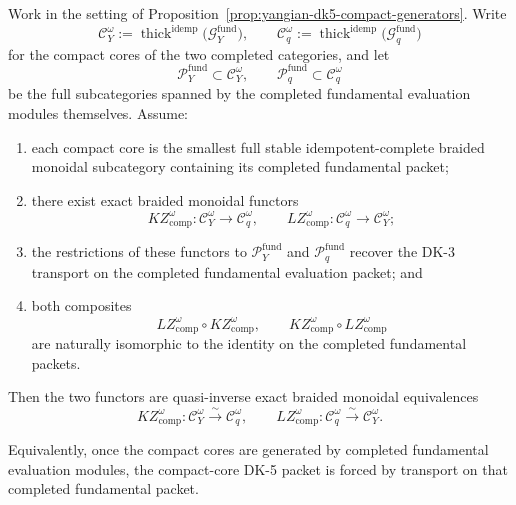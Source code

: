 \begin{proposition}
\label{prop:yangian-dk5-fundamental-packet}
Work in the setting of
Proposition~\ref{prop:yangian-dk5-compact-generators}.  Write
\[
\mathcal{C}_Y^\omega
:=
\operatorname{thick}^{\mathrm{idemp}}
\bigl(\mathcal{G}^{\mathrm{fund}}_{Y}\bigr),
\qquad
\mathcal{C}_q^\omega
:=
\operatorname{thick}^{\mathrm{idemp}}
\bigl(\mathcal{G}^{\mathrm{fund}}_{q}\bigr)
\]
for the compact cores of the two completed categories, and let
\[
\mathcal{P}^{\mathrm{fund}}_{Y}\subset \mathcal{C}_Y^\omega,
\qquad
\mathcal{P}^{\mathrm{fund}}_{q}\subset \mathcal{C}_q^\omega
\]
be the full subcategories spanned by the completed fundamental
evaluation modules themselves.  Assume:
\begin{enumerate}[label=\textup{(\roman*)}]
\item each compact core is the smallest full stable
  idempotent-complete braided monoidal subcategory containing its
  completed fundamental packet;
\item there exist exact braided monoidal functors
  \[
  KZ^\omega_{\mathrm{comp}}\colon
  \mathcal{C}_Y^\omega \to \mathcal{C}_q^\omega,
  \qquad
  LZ^\omega_{\mathrm{comp}}\colon
  \mathcal{C}_q^\omega \to \mathcal{C}_Y^\omega;
  \]
\item the restrictions of these functors to
  $\mathcal{P}^{\mathrm{fund}}_{Y}$ and
  $\mathcal{P}^{\mathrm{fund}}_{q}$ recover the DK-3 transport on the
  completed fundamental evaluation packet; and
\item both composites
  \[
  LZ^\omega_{\mathrm{comp}} \circ KZ^\omega_{\mathrm{comp}},
  \qquad
  KZ^\omega_{\mathrm{comp}} \circ LZ^\omega_{\mathrm{comp}}
  \]
  are naturally isomorphic to the identity on the completed
  fundamental packets.
\end{enumerate}
Then the two functors are quasi-inverse exact braided monoidal
equivalences
\[
KZ^\omega_{\mathrm{comp}}\colon
\mathcal{C}_Y^\omega \xrightarrow{\sim} \mathcal{C}_q^\omega,
\qquad
LZ^\omega_{\mathrm{comp}}\colon
\mathcal{C}_q^\omega \xrightarrow{\sim} \mathcal{C}_Y^\omega.
\]

Equivalently, once the compact cores are generated by completed
fundamental evaluation modules, the compact-core DK-5 packet is forced
by transport on that completed fundamental packet.
\end{proposition}


